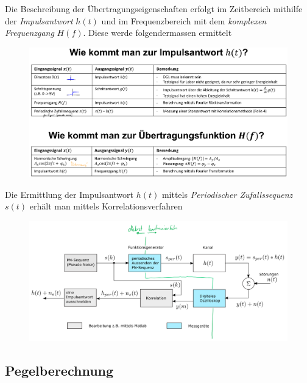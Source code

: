 \documentclass[
  10pt,
  a4paper,
  german]{article}
\numberwithin{equation}{section}
\begin{document}
Die Beschreibung der Übertragungseigenschaften erfolgt im Zeitbereich
mithilfe der \emph{Impulsantwort} \(h(t)\) und im Frequenzbereich mit
dem \emph{komplexen Frequenzgang} \(H(f)\). Diese werde folgendermassen
ermittelt

\begin{figure}[H]

{\centering \includegraphics{images/03_uebtertragungsfunktion.png}

}

\end{figure}

Die Ermittlung der Impulsantwort \(h(t)\) mittels \emph{Periodischer
Zufallssequenz} \(s(t)\) erhält man mittels Korrelationsverfahren

\begin{figure}[H]

{\centering \includegraphics{images/03_Korrelationsverfahren.png}

}

\end{figure}

\hypertarget{pegelberechnung}{%
\subsection{Pegelberechnung}\label{pegelberechnung}}
\end{document}
